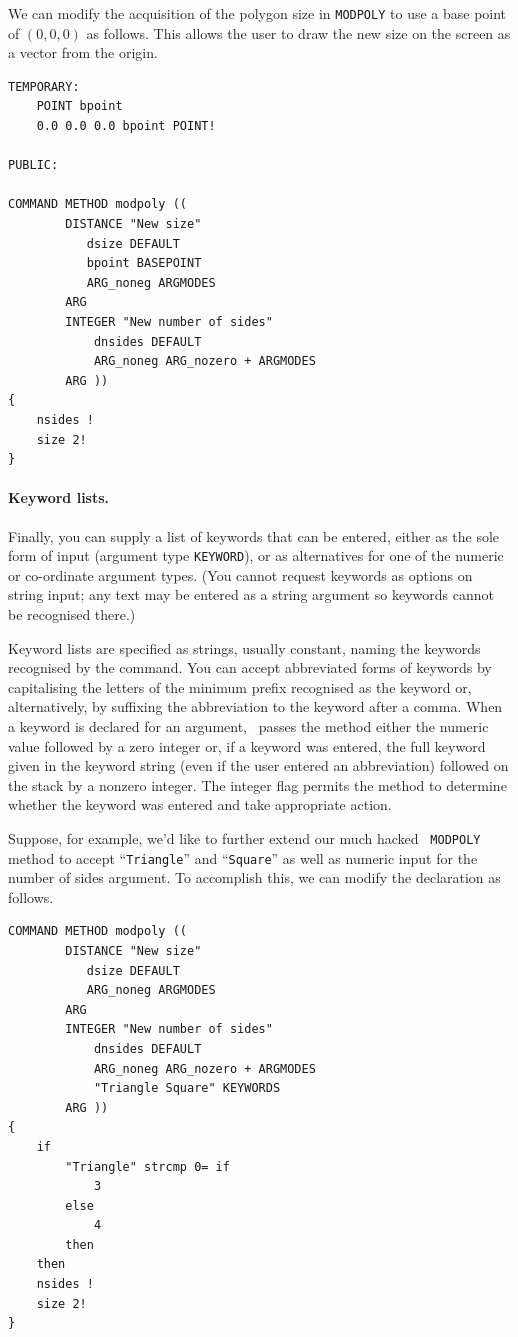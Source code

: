 \documentclass{article}
\begin{document}
We can modify the acquisition of the polygon size in {\tt MODPOLY} to
use a base point of $(0,0,0)$ as follows.  This allows the user to
draw the new size on the screen as a vector from the origin.

\begin{verbatim}
TEMPORARY:
    POINT bpoint
    0.0 0.0 0.0 bpoint POINT!

PUBLIC:

COMMAND METHOD modpoly ((
        DISTANCE "New size"
           dsize DEFAULT
           bpoint BASEPOINT
           ARG_noneg ARGMODES
        ARG
        INTEGER "New number of sides"
            dnsides DEFAULT
            ARG_noneg ARG_nozero + ARGMODES
        ARG ))
{
    nsides !
    size 2!
}
\end{verbatim}


\paragraph{Keyword lists.}
Finally, you can supply a list of keywords that can be entered,
either as the sole form of input (argument type {\tt KEYWORD}), or as
alternatives for one of the numeric or co-ordinate argument types.
(You cannot request keywords as options on string input; any text may
be entered as a string argument so keywords cannot be recognised
there.)

Keyword lists are specified as strings, usually constant, naming the
keywords recognised by the command.  You can accept abbreviated forms
of keywords by capitalising the letters of the minimum prefix recognised
as the keyword or, alternatively, by suffixing the abbreviation to the
keyword after a comma.  When a keyword is declared for an
argument, \cw\ passes the method either the numeric value followed by
a zero integer or, if a keyword was entered, the full keyword
given in the keyword string (even if the user entered an
abbreviation) followed on the stack by a nonzero integer.  The integer
flag permits the method to determine whether the keyword was entered and
take appropriate action.

Suppose, for example, we'd like to further extend our much hacked {\tt
MODPOLY} method to accept ``{\tt Triangle}'' and ``{\tt Square}'' as
well as numeric input for the number of sides argument.  To accomplish
this, we can modify the declaration as follows.

\begin{verbatim}
COMMAND METHOD modpoly ((
        DISTANCE "New size"
           dsize DEFAULT
           ARG_noneg ARGMODES
        ARG
        INTEGER "New number of sides"
            dnsides DEFAULT
            ARG_noneg ARG_nozero + ARGMODES
            "Triangle Square" KEYWORDS
        ARG ))
{
    if
        "Triangle" strcmp 0= if
            3
        else
            4
        then
    then
    nsides !
    size 2!
}
\end{verbatim}
\end{document}
